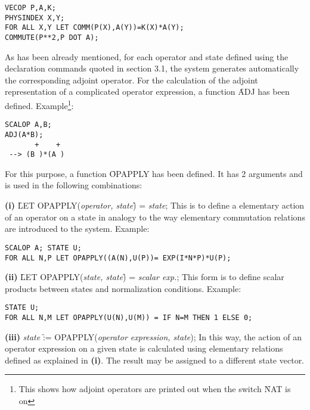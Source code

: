 \begin{verbatim}
VECOP P,A,K;
PHYSINDEX X,Y;
FOR ALL X,Y LET COMM(P(X),A(Y))=K(X)*A(Y);
COMMUTE(P**2,P DOT A);
\end{verbatim}


As has been already mentioned, for each operator and state defined
using the declaration commands quoted in section 3.1, the system
generates automatically the corresponding adjoint operator. For the
calculation of the adjoint representation of a complicated
operator expression, a function  \f{ADJ}  has been defined.
Example\footnote{This shows how adjoint operators are printed out
when the switch \f{NAT} is on}: 

\begin{verbatim}
SCALOP A,B;
ADJ(A*B);
       +    +
 --> (B )*(A )
\end{verbatim}


For this purpose, a function \f{OPAPPLY}  has been
defined.
It has 2 arguments and is used in the following combinations: 

\textbf{(i)}  \f{LET OPAPPLY(}\textit{operator, state}\f{) =} \textit{state};
This is to define a elementary
action of an operator on a state in analogy to the way
elementary commutation relations are introduced to the system.
Example:

\begin{verbatim}
SCALOP A; STATE U;
FOR ALL N,P LET OPAPPLY((A(N),U(P))= EXP(I*N*P)*U(P);
\end{verbatim}

\textbf{(ii)} \f{LET OPAPPLY(}\textit{state, state}\f{) =} \textit{scalar exp.};
This form is to define scalar products between states and normalization
conditions.
Example:

\begin{verbatim}
STATE U;
FOR ALL N,M LET OPAPPLY(U(N),U(M)) = IF N=M THEN 1 ELSE 0;
\end{verbatim}

\textbf{(iii)} \textit{state} \f{:= OPAPPLY(}\textit{operator expression, state});
 In this way, the action of an operator expression on a given state
 is calculated using elementary relations defined as explained in \textbf{(i)}.
 The result may be assigned to a different state vector.

